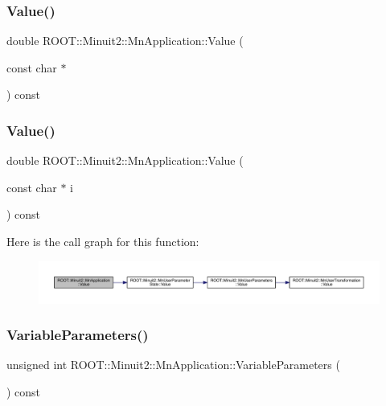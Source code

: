 \subsubsection{\texorpdfstring{Value()}{Value()}\hspace{0.1cm}{\footnotesize\ttfamily [5/6]}}
{\footnotesize\ttfamily double R\+O\+O\+T\+::\+Minuit2\+::\+Mn\+Application\+::\+Value (\begin{DoxyParamCaption}\item[{const char $\ast$}]{ }\end{DoxyParamCaption}) const}

\mbox{\label{classROOT_1_1Minuit2_1_1MnApplication_a0848e9b8eb22d5b23b6ba01ddcf8c135}} 
\subsubsection{\texorpdfstring{Value()}{Value()}\hspace{0.1cm}{\footnotesize\ttfamily [6/6]}}
{\footnotesize\ttfamily double R\+O\+O\+T\+::\+Minuit2\+::\+Mn\+Application\+::\+Value (\begin{DoxyParamCaption}\item[{const char $\ast$}]{i }\end{DoxyParamCaption}) const}

Here is the call graph for this function\+:
\nopagebreak
\begin{figure}[H]
\begin{center}
\leavevmode
\includegraphics[width=350pt]{df/dd5/classROOT_1_1Minuit2_1_1MnApplication_a0848e9b8eb22d5b23b6ba01ddcf8c135_cgraph}
\end{center}
\end{figure}
\mbox{\label{classROOT_1_1Minuit2_1_1MnApplication_afc0ad887758b1609cbcae1c8b6a5a467}} 
\subsubsection{\texorpdfstring{VariableParameters()}{VariableParameters()}\hspace{0.1cm}{\footnotesize\ttfamily [1/3]}}
{\footnotesize\ttfamily unsigned int R\+O\+O\+T\+::\+Minuit2\+::\+Mn\+Application\+::\+Variable\+Parameters (\begin{DoxyParamCaption}{ }\end{DoxyParamCaption}) const}

